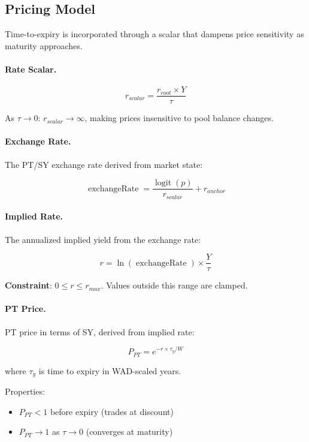 \subsection{Pricing Model}

Time-to-expiry is incorporated through a scalar that dampens price sensitivity as maturity approaches.

\paragraph{Rate Scalar.}

\[
r_{scalar} = \frac{r_{root} \times Y}{\tau}
\]

As $\tau \to 0$: $r_{scalar} \to \infty$, making prices insensitive to pool balance changes.

\paragraph{Exchange Rate.}

The PT/SY exchange rate derived from market state:

\[
\operatorname{exchangeRate} = \frac{\operatorname{logit}(p)}{r_{scalar}} + r_{anchor}
\]

\paragraph{Implied Rate.}

The annualized implied yield from the exchange rate:

\[
r = \ln(\operatorname{exchangeRate}) \times \frac{Y}{\tau}
\]

\textbf{Constraint}: $0 \leq r \leq r_{max}$. Values outside this range are clamped.

\paragraph{PT Price.}

PT price in terms of SY, derived from implied rate:

\[
P_{PT} = e^{-r \times \tau_y / W}
\]

where $\tau_y$ is time to expiry in WAD-scaled years.

Properties:
\begin{itemize}
    \item $P_{PT} < 1$ before expiry (trades at discount)
    \item $P_{PT} \to 1$ as $\tau \to 0$ (converges at maturity)
\end{itemize}

